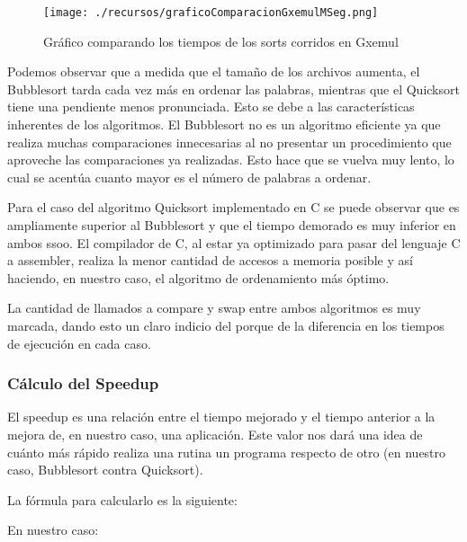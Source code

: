 \documentclass[a4paper,10pt]{article}
\begin{document}
\begin{figure}[h!]
	\centering
	\texttt{[image: ./recursos/graficoComparacionGxemulMSeg.png]}
	\caption{Gr\'afico comparando los tiempos de los sorts corridos en Gxemul}
\end{figure}


\newpage
\bigskip
Podemos observar que a medida que el tamaño de los archivos aumenta, el Bubblesort tarda cada vez más en ordenar las palabras, mientras que el Quicksort tiene una pendiente menos pronunciada. Esto se debe a las características inherentes de los algoritmos. El Bubblesort no es un algoritmo eficiente ya que realiza muchas comparaciones innecesarias al no presentar un procedimiento que aproveche las comparaciones ya realizadas. Esto hace que se vuelva muy lento, lo cual se acent\'ua cuanto mayor es el n\'umero de palabras a ordenar.

Para el caso del algoritmo Quicksort implementado en C se puede observar que es ampliamente superior al Bubblesort y que el tiempo demorado es muy inferior en ambos ssoo. El compilador de C, al estar ya optimizado para pasar del lenguaje C a assembler, realiza la menor cantidad de accesos a memoria posible y así haciendo, en nuestro caso, el algoritmo de ordenamiento más óptimo.

La cantidad de llamados a compare y swap entre ambos algoritmos es muy marcada, dando esto un claro indicio del porque de la diferencia en los tiempos de ejecuci\'on en cada caso.



\newpage
\subsubsection{C\'alculo del Speedup}
El speedup es una relaci\'on entre el tiempo mejorado y el tiempo anterior a la mejora de, en nuestro caso, una aplicaci\'on. Este valor nos dar\'a una idea de cu\'anto m\'as r\'apido realiza una rutina un programa respecto de otro (en nuestro caso, Bubblesort contra Quicksort).

La f\'ormula para calcularlo es la siguiente:
\begin{center}
\end{center}

\medskip
En nuestro caso:

\begin{center}
\end{center}
\smallskip
\begin{center}
\end{center}
\end{document}
